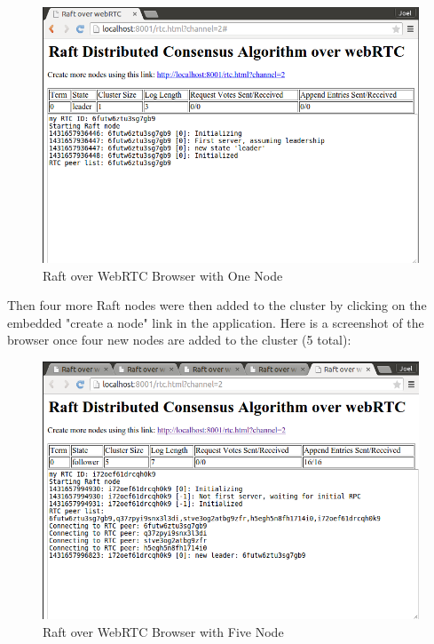 \documentclass{acmtog} %
\begin{document}
\begin{figure}[Ht]
\centerline{\includegraphics[width=15cm]{browser_1}}
\caption{Raft over WebRTC Browser with One Node}
  \label{fig:browser_1}
\end{figure}

Then four more Raft nodes were then added to the cluster by clicking
on the embedded "create a node" link in the application. Here is
a screenshot of the browser once four new nodes are added to the
cluster (5 total):

\begin{figure}[Ht]
\centerline{\includegraphics[width=15cm]{browser_2}}
\caption{Raft over WebRTC Browser with Five Node}
  \label{fig:browser_2}
\end{figure}
\end{document}
